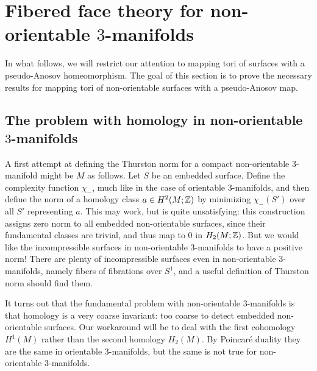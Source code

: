 \section{Fibered face theory for non-orientable $3$-manifolds}
\label{sec:fibered-face-theory}

In what follows, we will restrict our attention to mapping
tori of surfaces with a pseudo-Anosov homeomorphism.  %
The goal of this section is to prove the necessary results for mapping tori of non-orientable surfaces with a pseudo-Anosov map.%

\subsection{The problem with homology in non-orientable $3$-manifolds}
\label{sec:probl-with-homol}

A first attempt at defining the Thurston norm for a compact non-orientable $3$-manifold might be $M$ as follows.
Let $S$ be an embedded surface.  Define the complexity function $\chi_-$,
much like in the case of orientable $3$-manifolds, and then define the norm of a homology class
$a \in H^2(M; \mathbb{Z})$ by minimizing $\chi_-(S')$ over all $S'$ representing $a$. This may work, but is quite
unsatisfying: this construction assigns zero norm to all embedded non-orientable surfaces, since their
fundamental classes are trivial, and thus map to $0$ in $H_2(M; \mathbb{Z})$. But we would like the
incompressible surfaces in non-orientable $3$-manifolds to have a positive norm! There are plenty of
incompressible surfaces even in non-orientable $3$-manifolds, namely fibers of fibrations over $S^1$, and a useful definition of Thurston norm should find them.

It turns out that the fundamental problem with non-orientable $3$-manifolds is that homology is a
very coarse invariant: too coarse to detect embedded non-orientable surfaces. Our workaround will
be to deal with the first cohomology $H^1(M)$ rather than the second homology $H_2(M)$. By Poincar\'e duality they are the same in orientable 3-manifolds, but the same is not true for non-orientable $3$-manifolds.


